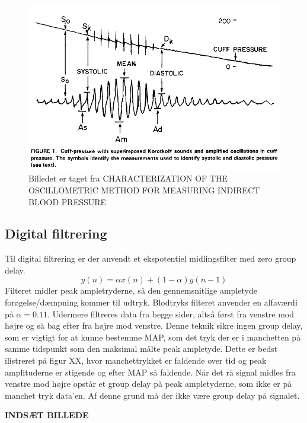 \begin{figure}[H]
	\includegraphics[width=\textwidth]{billeder/OptimalBlodtryksmaling.png}
	\caption{Billedet er taget fra CHARACTERIZATION 	 OF THE OSClLLOMETRlC METHOD FOR MEASURING INDIRECT BLOOD 	PRESSURE}\label{fig:goodMeasurement}
\end{figure}

\subsection{Digital filtrering}
Til digital filtrering er der anvendt et ekspotentiel midlingsfilter med zero group delay.
\begin{equation}
	y(n) = \alpha x(n)+(1-\alpha )y(n-1)
\end{equation}
Filteret midler peak ampletryderne, så den gennemsnitlige ampletyde forøgelse/dæmpning kommer til udtryk. Blodtryks filteret anvender en alfaværdi på $\alpha = 0.11$. Udermere filtreres data fra begge sider, altså først fra venstre mod højre og så bag efter fra højre mod venstre. Denne teknik sikre ingen group delay, som er vigtigt for at kunne bestemme MAP, som det tryk der er i manchetten på samme tidspunkt som den maksimal målte peak ampletyde. Dette er bedst ilistreret på figur XX, hvor manchettrykket er faldende over tid og peak amplituderne er stigende og efter MAP så faldende. Når det rå signal midles fra venstre mod højre opstår et group delay på peak ampletyderne, som ikke er på manchet tryk data'en. Af denne grund må der ikke være group delay på signalet.

\textbf{INDSÆT BILLEDE}


